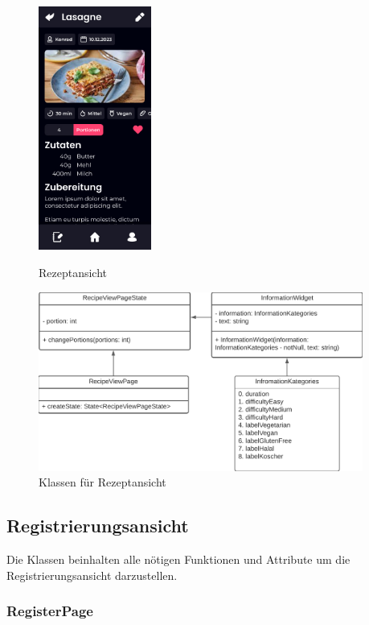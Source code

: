 \documentclass{entwurfsheft}
\begin{document}
\begin{figure}[htp]
    \begin{minipage}
        [t]{0.49\textwidth}
        \centering
        \includegraphics[height=80mm]{images/Presentation-layer/RecipeView.jpg}
        \caption{Rezeptansicht}
    \end{minipage}
    \begin{minipage}
        [t]{0.49\textwidth}
        \centering
        \includegraphics[width=0.95\textwidth]{images/Presentation-layer/RecipeViewClass.png}
        \caption{Klassen für Rezeptansicht}
    \end{minipage}
\end{figure}

\newpage

\subsection{Registrierungsansicht}
Die Klassen beinhalten alle nötigen Funktionen und Attribute um die Registrierungsansicht darzustellen.

\subsubsection{RegisterPage}\label{sec:RegisterPage}
\end{document}
